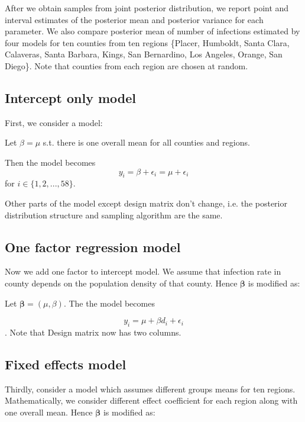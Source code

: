 \documentclass[11pt,twocolumn]{asaproc}
\begin{document}
After we obtain samples from joint posterior distribution, we report point and interval estimates of the posterior mean and posterior variance for each parameter. We also compare posterior mean of number of infections estimated by four models for ten counties from ten regions \{Placer, Humboldt, Santa Clara, Calaveras, Santa Barbara, Kings, San Bernardino, Los Angeles, Orange, San Diego\}. Note that counties from each region are chosen at random. 




\subsection{Intercept only model}

First, we consider a model:
 
 Let $\beta = \mu$ s.t. there is one overall mean for all counties and regions. 
  
 Then the model becomes $$y_{i} = \beta + \epsilon_{i} = \mu + \epsilon_{i} $$ for $i \in \{1, 2, ..., 58\}$.
 
 Other parts of the model except design matrix don't change, i.e. the posterior distribution structure and sampling algorithm are the same.
  
 
 


\subsection{One factor regression model}

Now we add one factor to intercept model. We assume that infection rate in county depends on the population density of that county. Hence $\pmb{\beta} $ is modified as: 
 
 Let $\pmb{\beta} =  (\mu, \beta)$. The the model becomes 
 
 $$y_i = \mu + \beta d_{i} + \epsilon_{i}$$. Note that Design matrix now has two columns. 
 




\subsection{Fixed effects model}

Thirdly, consider a model which assumes different groups means for ten regions. Mathematically, we consider different effect coefficient for each region along with one overall mean. Hence $\pmb{\beta} $ is modified as: 
 
\end{document}
